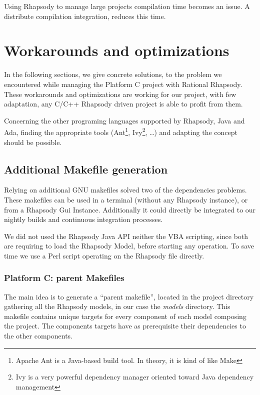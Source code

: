 \documentclass[dvips]{imsart}
\begin{document}
Using Rhapsody to manage large projects compilation time becomes an
issue. A distribute compilation integration, reduces this time.
\section{Workarounds and optimizations}
In the following sections, we give concrete solutions, to the problem we
encountered while managing the Platform C project with Rational Rhapsody.
These workarounds and optimizations are working for our project, with few
adaptation, any C/C++ Rhapsody driven project is able to profit from them.

Concerning the other programing languages supported by Rhapsody, Java and Ada,
finding the appropriate tools (Ant\footnote{Apache Ant is a Java-based build
tool. In theory, it is kind of like Make}, Ivy\footnote{Ivy is a very powerful
dependency manager oriented toward Java dependency management}, \ldots) and
adapting the concept should be possible.

\subsection{Additional Makefile generation}
Relying on additional GNU makefiles solved two of the dependencies problems.
These makefiles can be used in a terminal (without any Rhapsody instance), or
from a Rhapsody Gui Instance. Additionally it could directly be integrated to
our nightly builds and continuous integration processes.

We did not used the Rhapsody Java API neither the VBA scripting, since both
are requiring to load the Rhapsody Model, before starting any operation. To
save time we use a Perl script operating on the Rhapsody file directly.

\subsubsection{Platform C: parent Makefiles}
The main idea is to generate a ``parent makefile'', located in the project
directory gathering all the Rhapsody models, in our case the \emph{models}
directory. This makefile contains unique targets for every component of each
model composing the project. The components targets have as prerequisite their
dependencies to the other components.
\end{document}
